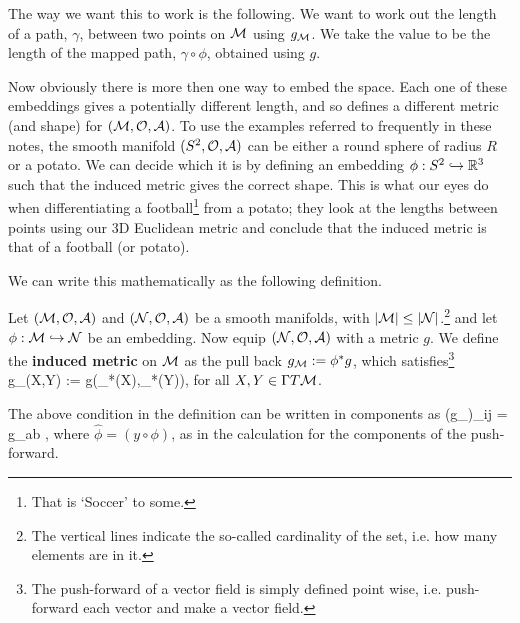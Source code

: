 The way we want this to work is the following. We want to work out the length of a path, $\gamma$, between two points on $\mathcal{M}$ using $g_{\mathcal{M}}$. We take the value to be the length of the mapped path, $\gamma\circ\phi$, obtained using $g$. 

Now obviously there is more then one way to embed the space. Each one of these embeddings gives a potentially different length, and so defines a different metric (and shape) for $(\mathcal{M},\mathcal{O},\mathcal{A})$. To use the examples referred to frequently in these notes, the smooth manifold $(S^2,\mathcal{O},\mathcal{A})$ can be either a round sphere of radius $R$ or a potato. We can decide which it is by defining an embedding $\phi:S^2\hookrightarrow\mathbb{R}^3$ such that the induced metric gives the correct shape. This is what our eyes do when differentiating a football\footnote{That is `Soccer' to some.} from a potato; they look at the lengths between points using our 3D Euclidean metric and conclude that the induced metric is that of a football (or potato). 

We can write this mathematically as the following definition. 

    Let $(\mathcal{M},\mathcal{O},\mathcal{A})$ and $(\mathcal{N},\mathcal{O},\mathcal{A})$ be a smooth manifolds, with $|\mathcal{M}|\leq |\mathcal{N}|$.\footnote{The vertical lines indicate the so-called cardinality of the set, i.e. how many elements are in it.} and let $\phi:\mathcal{M}\hookrightarrow\mathcal{N}$ be an embedding. Now equip $(\mathcal{N},\mathcal{O},\mathcal{A})$ with a metric $g$. We define the \textbf{induced metric} on $\mathcal{M}$ as the pull back $g_{\mathcal{M}} := \phi^* g$, which satisfies\footnote{The push-forward of a vector field is simply defined point wise, i.e. push-forward each vector and make a vector field.} 
    \bse 
        g_{\cM}(X,Y) := g\big(\phi_*(X),\phi_*(Y)\big),
    \ese 
    for all $X,Y\in \Gamma T\mathcal{M}$. 
\ed 

The above condition in the definition can be written in components as 
\bse
    (g_{\cM})_{ij} = g_{ab} ,
\ese 
where $\hat{\phi} = (y\circ \phi)$, as in the calculation for the components of the push-forward.

